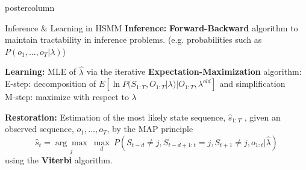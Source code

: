 \documentclass[final,hyperref={pdfpagelabels=false}]{beamer}
\newlength{\columnheight}
\begin{document}
\begin{frame}
\begin{columns}
    \begin{column}{.50\textwidth}
      \begin{beamercolorbox}[center,wd=\textwidth]{postercolumn}
        \begin{minipage}[T]{.98\textwidth} %
          \parbox[t][\columnheight]{\textwidth}{ %
            \begin{block}{Inference \& Learning in HSMM}
                \textbf{Inference:}
                \textbf{Forward-Backward} algorithm to maintain tractability in inference problems.
                (e.g. probabilities such as $P(o_1, ..., o_T | \lambda)$)

                \vskip0.5cm
                \textbf{Learning:}
                MLE of $\hat\lambda$ via the iterative \textbf{Expectation-Maximization} algorithm:\\
                E-step: decomposition of $E[\ln P(S_{1:T}, O_{1:T} | \lambda) | O_{1:T}, \lambda^{old}]$ and simplification\\
                M-step: maximize with respect to $\lambda$

                \vskip0.5cm
                \textbf{Restoration:} Estimation of the most likely state sequence, $\hat s_{1:T}$ ,
                given an observed sequence, $o_1, ..., o_T$, by the MAP principle
                { $$\hat s_t = \underset{j}{\arg\max}~\underset{d}{\max}~P(S_{t-d} \neq j, S_{t-d+1:t} = j, S_{t+1} \neq j, o_{1:t} | \hat\lambda)$$}
                using the \textbf{Viterbi} algorithm.
            \end{block}

}
\end{minipage}
\end{beamercolorbox}
\end{column}
\end{columns}
\end{frame}
\end{document}

